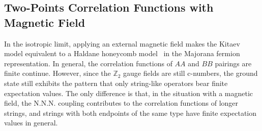 \documentclass[12font]{article}
\numberwithin{equation}{section}    %
\theoremstyle{definition}
\newcommand{\alert}[1]{{\color{red}#1}}
\begin{document}
\subsection{Two-Points Correlation Functions with Magnetic Field}
In the isotropic limit, applying an external magnetic field makes the Kitaev model equivalent to a Haldane honeycomb model~\cite{Haldane_1988} in the Majorana fermion representation. In general, the correlation functions of $AA$ and $BB$ pairings are finite \alert{continue}. However, since the $\mathbb{Z}_2$ gauge fields are still c-numbers, the ground state still exhibits the pattern that only string-like operators bear finite expectation values. The only difference is that, in the situation with a magnetic field, the N.N.N. coupling contributes to the correlation functions of longer strings, and strings with both endpoints of the same type have finite expectation values in general. 
\end{document}
